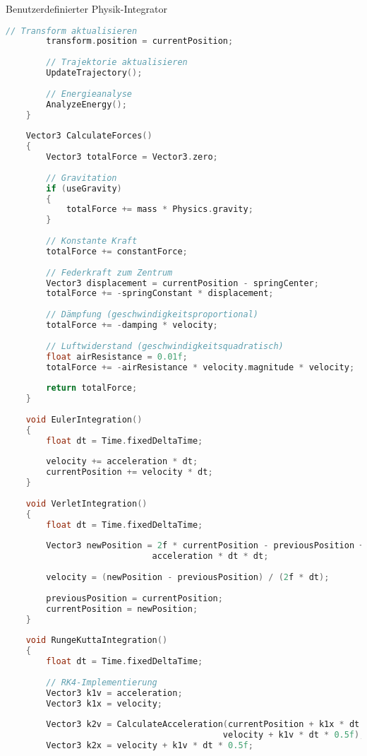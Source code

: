 \begin{code}{Benutzerdefinierter Physik-Integrator}
\begin{lstlisting}[language=C, style=basesmol]
        // Transform aktualisieren
        transform.position = currentPosition;
        
        // Trajektorie aktualisieren
        UpdateTrajectory();
        
        // Energieanalyse
        AnalyzeEnergy();
    }
    
    Vector3 CalculateForces() 
    {
        Vector3 totalForce = Vector3.zero;
        
        // Gravitation
        if (useGravity) 
        {
            totalForce += mass * Physics.gravity;
        }
        
        // Konstante Kraft
        totalForce += constantForce;
        
        // Federkraft zum Zentrum
        Vector3 displacement = currentPosition - springCenter;
        totalForce += -springConstant * displacement;
        
        // Dämpfung (geschwindigkeitsproportional)
        totalForce += -damping * velocity;
        
        // Luftwiderstand (geschwindigkeitsquadratisch)
        float airResistance = 0.01f;
        totalForce += -airResistance * velocity.magnitude * velocity;
        
        return totalForce;
    }
    
    void EulerIntegration() 
    {
        float dt = Time.fixedDeltaTime;
        
        velocity += acceleration * dt;
        currentPosition += velocity * dt;
    }
    
    void VerletIntegration() 
    {
        float dt = Time.fixedDeltaTime;
        
        Vector3 newPosition = 2f * currentPosition - previousPosition + 
                             acceleration * dt * dt;
        
        velocity = (newPosition - previousPosition) / (2f * dt);
        
        previousPosition = currentPosition;
        currentPosition = newPosition;
    }
    
    void RungeKuttaIntegration() 
    {
        float dt = Time.fixedDeltaTime;
        
        // RK4-Implementierung
        Vector3 k1v = acceleration;
        Vector3 k1x = velocity;
        
        Vector3 k2v = CalculateAcceleration(currentPosition + k1x * dt * 0.5f, 
                                           velocity + k1v * dt * 0.5f);
        Vector3 k2x = velocity + k1v * dt * 0.5f;
        

\end{lstlisting}
\end{code}
